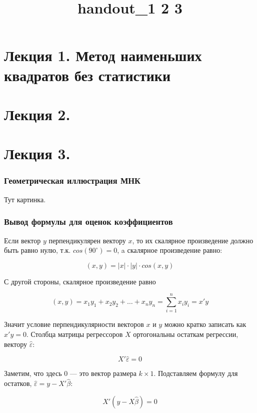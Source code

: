 \documentclass[]{article}
\title{handout\_1 2 3}
\author{}
\date{}
\begin{document}
\maketitle


{
\hypersetup{linkcolor=black}
\setcounter{tocdepth}{3}
\tableofcontents
}
\section{Лекция 1. Метод наименьших квадратов без
статистики}\label{-1.-----}

\section{Лекция 2.}\label{-2.}

\section{Лекция 3.}\label{-3.}

\subsubsection{Геометрическая иллюстрация МНК}\label{--}

Тут картинка.

\subsubsection{Вывод формулы для оценок коэффициентов}\label{----}

Если вектор $y$ перпендикулярен вектору $x$, то их скалярное
произведение должно быть равно нулю, т.к. $cos(90^\circ)=0$, a скалярное
произведение равно:

\[
(x,y)=|x|\cdot  |y| \cdot cos(x,y)
\]

С другой стороны, скалярное произведение равно

\[
(x,y)=x_1 y_1+x_2 y_2 + \ldots + x_n y_n = \sum_{i=1}^n x_i y_i = x'y
\]

Значит условие перпендикулярности векторов $x$ и $y$ можно кратко
записать как $x'y=0$. Столбца матрицы регрессоров $X$ ортогональны
остаткам регрессии, вектору $\hat{\varepsilon}$:

\[
X'\hat{\varepsilon}=0
\]

Заметим, что здесь 0 --- это вектор размера $k\times 1$. Подставляем
формулу для остатков, $\hat{\varepsilon}=y-X'\hat{\beta}$:

\[
X'(y-X\hat{\beta})=0
\]
\end{document}
